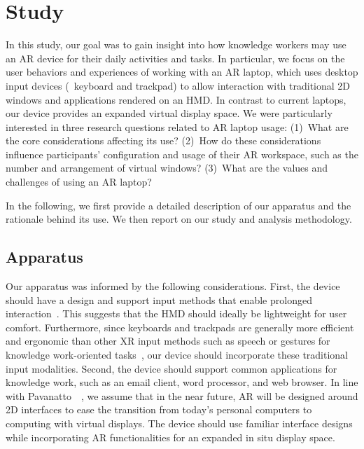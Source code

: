 \section{Study}
In this study, our goal was to gain insight into how knowledge workers may use an AR device for their daily activities and tasks.
In particular, we focus on the user behaviors and experiences of working with an AR laptop, 
which uses desktop input devices (\ie~keyboard and trackpad) to allow interaction with traditional 2D windows and applications rendered on an HMD.
In contrast to current laptops, our device provides an expanded virtual display space. 
We were particularly interested in three research questions related to AR laptop usage:
(1)~What are the core considerations affecting its use?
(2)~How do these considerations influence participants' configuration and usage of their AR workspace, such as the number and arrangement of virtual windows?
(3)~What are the values and challenges of using an AR laptop?

In the following, we first provide a detailed description of our apparatus and the rationale behind its use.
We then report on our study and analysis methodology. 

\subsection{Apparatus}
\label{sec:apparatus}

Our apparatus %
was informed by the following considerations.
First, the device should have a design and support input methods that enable prolonged interaction~\cite{cheng2022comfortable}.
This suggests that the HMD should ideally be lightweight for user comfort. 
Furthermore, since keyboards and trackpads are generally more efficient and ergonomic than other XR input methods such as speech or gestures for knowledge work-oriented tasks~\cite{zhou2022indepthmouse,knierim2018physicalkeyboardsvr}, our device should incorporate these traditional input modalities.
Second, the device should support common applications for knowledge work, such as an email client, word processor, and web browser. 
In line with Pavanatto~\etal~\cite{pavanatto2024multiplemonitors}, we assume that in the near future, AR will be designed around 2D interfaces to ease the transition from today's personal
computers to computing with virtual displays. 
The device should use familiar interface designs while incorporating AR functionalities for an expanded in situ display space.
 
